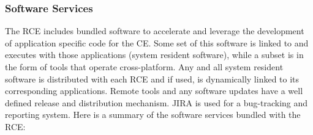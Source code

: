 \subsubsection{Software Services}

The RCE includes bundled software to accelerate and leverage the development of application specific code for the CE. Some set of this software is linked to and executes with those applications (system resident software), while a subset is in the form of tools that operate cross-platform. Any and all system resident software is distributed with each RCE and if used, is dynamically linked to its corresponding applications. Remote tools and any software updates have a well defined release and distribution mechanism. JIRA is used for a bug-tracking and reporting system. Here is a summary of the software services bundled with the RCE:
